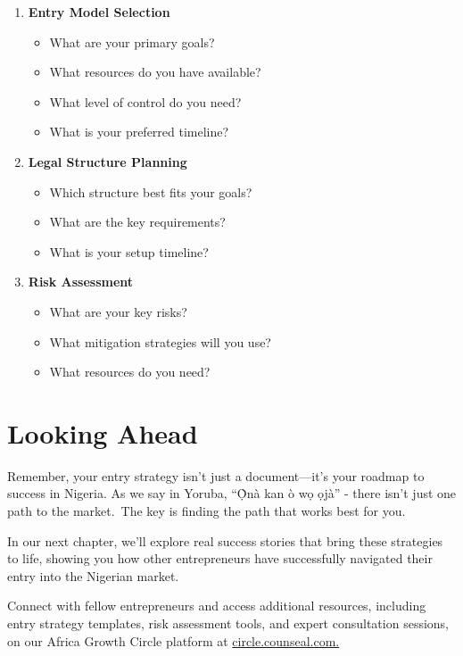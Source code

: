 \begin{enumerate}
    \item \textbf{Entry Model Selection}
    \begin{itemize}
        \item What are your primary goals?
        \item What resources do you have available?
        \item What level of control do you need?
        \item What is your preferred timeline?
    \end{itemize}
    \item \textbf{Legal Structure Planning}
    \begin{itemize}
        \item Which structure best fits your goals?
        \item What are the key requirements?
        \item What is your setup timeline?
    \end{itemize}
    \item \textbf{Risk Assessment}
    \begin{itemize}
        \item What are your key risks?
        \item What mitigation strategies will you use?
        \item What resources do you need?
    \end{itemize}
\end{enumerate}

\section{Looking Ahead}\label{sec:looking-ahead}

Remember, your entry strategy isn't just a document—it's your roadmap to success in Nigeria.
As we say in Yoruba, ``Ọ̀nà kan ò wọ ọjà'' - there isn't just one path to the market.\ The key is finding the path that works best for you.

In our next chapter, we'll explore real success stories that bring these strategies to life, showing you how other entrepreneurs have successfully navigated their entry into the Nigerian market.

Connect with fellow entrepreneurs and access additional resources, including entry strategy templates, risk assessment tools, and expert consultation sessions, on our Africa Growth Circle platform at \href{https://viz.li/csl-book-circle}{circle.counseal.com.}

